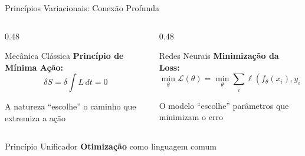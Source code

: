 \documentclass[aspectratio=169,12pt]{beamer}
\begin{document}
\begin{frame}{Princípios Variacionais: Conexão Profunda}
    \begin{columns}[T]
        \begin{column}{0.48\textwidth}
            \begin{block}{Mecânica Clássica}
                \textbf{Princípio de Mínima Ação:}
                \begin{equation*}
                    \delta S = \delta \int L \, dt = 0
                \end{equation*}

                A natureza ``escolhe'' o caminho que extremiza a ação
            \end{block}
        \end{column}
        \begin{column}{0.48\textwidth}
            \begin{block}{Redes Neurais}
                \textbf{Minimização da Loss:}
                \begin{equation*}
                    \min_\theta \mathcal{L}(\theta) = \min_\theta \sum_i \ell(f_\theta(x_i), y_i)
                \end{equation*}

                O modelo ``escolhe'' parâmetros que minimizam o erro
            \end{block}
        \end{column}
    \end{columns}

    \vspace{0.5cm}

    \begin{alertblock}{Princípio Unificador}
        \centering
        \textbf{Otimização} como linguagem comum
    \end{alertblock}
\end{frame}
\end{document}
